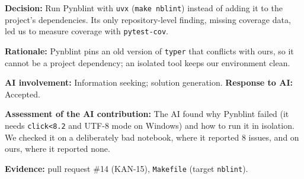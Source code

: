 \documentclass[11pt]{article}
\begin{document}
\noindent\textbf{Decision:} Run Pynblint with \texttt{uvx} (\texttt{make nblint}) instead of adding it to the project's dependencies. Its only repository-level finding, missing coverage data, led us to measure coverage with \texttt{pytest-cov}.

\noindent\textbf{Rationale:} Pynblint pins an old version of \texttt{typer} that conflicts with ours, so it cannot be a project dependency; an isolated tool keeps our environment clean.

\noindent\textbf{AI involvement:} Information seeking; solution generation. \textbf{Response to AI:} Accepted.

\noindent\textbf{Assessment of the AI contribution:} The AI found why Pynblint failed (it needs \texttt{click<8.2} and UTF-8 mode on Windows) and how to run it in isolation. We checked it on a deliberately bad notebook, where it reported 8 issues, and on ours, where it reported none.

\noindent\textbf{Evidence:} pull request \#14 (KAN-15), \texttt{Makefile} (target \texttt{nblint}).
\end{document}
